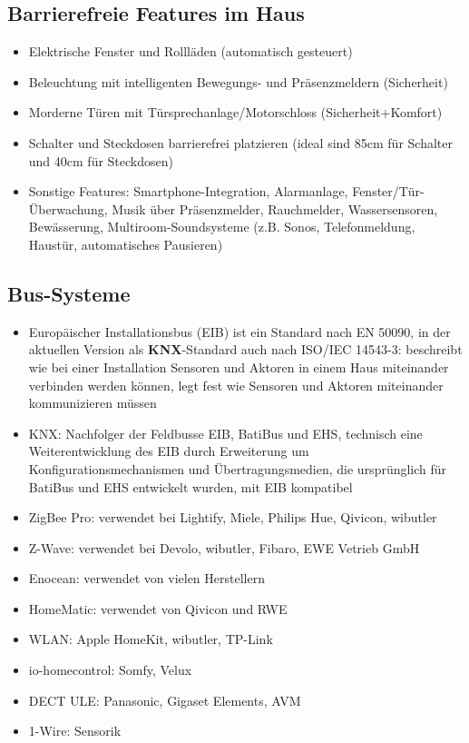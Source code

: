 \documentclass[paper=a4, fontsize=11pt]{scrartcl} %
\numberwithin{equation}{section} %
\numberwithin{figure}{section} %
\numberwithin{table}{section} %
\begin{document}
\subsection{Barrierefreie Features im Haus}

\begin{itemize}
\item Elektrische Fenster und Rollläden (automatisch gesteuert)
\item Beleuchtung mit intelligenten Bewegungs- und Präsenzmeldern (Sicherheit)
\item Morderne Türen mit Türsprechanlage/Motorschloss (Sicherheit+Komfort)
\item Schalter und Steckdosen barrierefrei platzieren (ideal sind 85cm für Schalter und 40cm für Steckdosen)
\item Sonstige Features: Smartphone-Integration, Alarmanlage, Fenster/Tür-Überwachung, Musik über Präsenzmelder, Rauchmelder, Wassersensoren, Bewässerung, Multiroom-Soundsysteme (z.B. Sonos, Telefonmeldung, Haustür, automatisches Pausieren)
\end{itemize}

\subsection{Bus-Systeme}

\begin{itemize}
\item Europäischer Installationsbus (EIB) ist ein Standard nach EN 50090, in der aktuellen Version als \textbf{KNX}-Standard auch nach ISO/IEC 14543-3: beschreibt wie bei einer Installation Sensoren und Aktoren in einem Haus miteinander verbinden werden können, legt fest wie Sensoren und Aktoren miteinander kommunizieren müssen
\item KNX: Nachfolger der Feldbusse EIB, BatiBus und EHS, technisch eine Weiterentwicklung des EIB durch Erweiterung um Konfigurationsmechanismen und Übertragungsmedien, die ursprünglich für BatiBus und EHS entwickelt wurden, mit EIB kompatibel
\item ZigBee Pro: verwendet bei Lightify, Miele, Philips Hue, Qivicon, wibutler
\item Z-Wave: verwendet bei Devolo, wibutler, Fibaro, EWE Vetrieb GmbH
\item Enocean: verwendet von vielen Herstellern
\item HomeMatic: verwendet von Qivicon und RWE
\item WLAN: Apple HomeKit, wibutler, TP-Link
\item io-homecontrol: Somfy, Velux
\item DECT ULE: Panasonic, Gigaset Elements, AVM
\item 1-Wire: Sensorik
\end{itemize}
\end{document}
